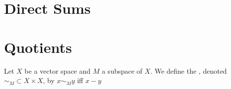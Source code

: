 \documentclass{book}
\begin{document}
	
	
	
	
	
	
	
	
	
	
	
	
	
	
	
	
	
	
	
	\section{Direct Sums}
	
	
	
	
	
	
	
	
	
	
	
	
	
	
	
	
	
	
	
	
	
	
	
	
	
	
	
	
	
	
	
	
	
	
	
	
	
	
	
	
	
	
	
	
	
	
	
	
	
	\section{Quotients}
	
	Let $X$ be a vector space and $M$ a subspace of $X$. We define the , denoted $\sim_M \subset X \times X$, by $x \sim_M y$ iff $x - y$
	
	
	
	
	
	
	
	
	
	
	
	
	
	
	
	
	
	
	
	
	
	
	
\end{document}
